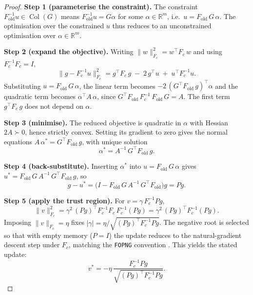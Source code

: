 \begin{proof}
\textbf{Step 1 (parameterise the constraint).}
The constraint $F_{\mathrm{old}}^{-1} u \in \operatorname{Col}(G)$ means
$F_{\mathrm{old}}^{-1} u = G\alpha$ for some $\alpha \in \mathbb{R}^m$,
i.e.\ $u = F_{\mathrm{old}}\, G\, \alpha$.
The optimisation over the constrained $u$ thus reduces to an unconstrained
optimisation over $\alpha \in \mathbb{R}^m$.

\textbf{Step 2 (expand the objective).}
Writing $\|w\|_{F_c}^2 = w^\top F_c\, w$ and using $F_c^{-1} F_c = I$,
\begin{equation}
    \bigl\| g - F_c^{-1} u \bigr\|_{F_c}^2
    = g^\top F_c\, g \;-\; 2\, g^\top u \;+\; u^\top F_c^{-1} u .
\end{equation}
Substituting $u = F_{\mathrm{old}}\, G\, \alpha$, the linear term becomes
$-2\,(G^\top F_{\mathrm{old}}\, g)^\top \alpha$ and the quadratic term
becomes $\alpha^\top A\, \alpha$, since
$G^\top F_{\mathrm{old}}\, F_c^{-1}\, F_{\mathrm{old}}\, G = A$.
The first term $g^\top F_c\, g$ does not depend on $\alpha$.

\textbf{Step 3 (minimise).}
The reduced objective is quadratic in $\alpha$ with Hessian $2A \succ 0$,
hence strictly convex.
Setting its gradient to zero gives the normal equations
$A\,\alpha^* = G^\top F_{\mathrm{old}}\, g$, with unique solution
\begin{equation}
\label{eq:alpha_star}
    \alpha^* = A^{-1}\, G^\top F_{\mathrm{old}}\, g .
\end{equation}

\textbf{Step 4 (back-substitute).}
Inserting $\alpha^*$ into $u = F_{\mathrm{old}}\, G\, \alpha$ gives
$u^* = F_{\mathrm{old}}\, G\, A^{-1}\, G^\top F_{\mathrm{old}}\, g$, so
\begin{equation}
    g - u^* = \bigl(I - F_{\mathrm{old}}\, G\, A^{-1}\,
              G^\top F_{\mathrm{old}}\bigr) g = P g .
\end{equation}

\textbf{Step 5 (apply the trust region).}
For $v = \gamma\, F_c^{-1} P g$,
\begin{equation}
    \|v\|_{F_c}^2
    = \gamma^2\,(Pg)^\top F_c^{-1} F_c\, F_c^{-1} (Pg)
    = \gamma^2\,(Pg)^\top F_c^{-1} (Pg).
\end{equation}
Imposing $\|v\|_{F_c} = \eta$ fixes
$|\gamma| = \eta / \sqrt{(Pg)^\top F_c^{-1} P g}$.
The negative root is selected so that with empty memory ($P = I$) the update
reduces to the natural-gradient descent step under $F_c$, matching the
\texttt{FOPNG} convention \citep{garg_fisher-orthogonal_2026}.
This yields the stated update:
\begin{equation}
    v^* = -\eta\, \frac{F_c^{-1} P g}{\sqrt{(Pg)^\top F_c^{-1} P g}}.
\end{equation}
\end{proof}


